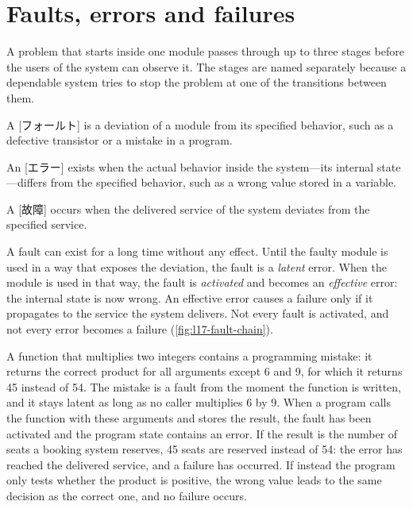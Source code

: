 \documentclass[../main.tex]{subfiles}
\begin{document}
\section{Faults, errors and failures}
\label{sec:l17-fault-error-failure}

A problem that starts inside one module passes through up to three stages
before the users of the system can observe it.  The stages are named separately because a
dependable system tries to stop the problem at one of the transitions
between them.

\begin{definition}
  \label{def:l17-fault-error-failure}
  A [フォールト] is a deviation of a module from its specified
  behavior, such as a defective transistor or a mistake in a program.

  An [エラー] exists when the actual behavior inside the
  system---its internal state---differs from the specified behavior, such as
  a wrong value stored in a variable.

  A [故障] occurs when the delivered service of the system
  deviates from the specified service.
\end{definition}

A fault can exist for a long time without any effect.  Until the faulty
module is used in a way that exposes the deviation, the fault is a
\emph{latent} error.  When the module is used in that way, the fault is
\emph{activated} and becomes an \emph{effective} error: the internal state
is now wrong.  An effective error causes a failure only if it propagates to
the service the system delivers.  Not every fault is activated, and not every error becomes a
failure (\cref{fig:l17-fault-chain}).

\begin{example}
  \label{ex:l17-fault-chain}
  A function that multiplies two integers contains a programming mistake:
  it returns the correct product for all arguments except 6 and 9, for
  which it returns 45 instead of 54.  The mistake is a fault from the moment
  the function is written, and it stays latent as long as no caller
  multiplies 6 by 9.  When a program calls the function with these arguments
  and stores the result, the fault has been activated and the program state
  contains an error.  If the result is the number of seats a booking system
  reserves, 45 seats are reserved instead of 54: the error has reached the
  delivered service, and a failure has occurred.  If instead the program
  only tests whether the product is positive, the wrong value leads to the
  same decision as the correct one, and no failure occurs.
\end{example}
\end{document}
